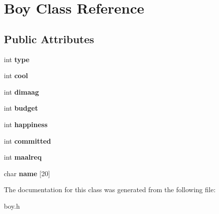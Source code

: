 \section{Boy Class Reference}
\label{class_boy}
\subsection*{Public Attributes}
\begin{DoxyCompactItemize}
\item 
\mbox{\label{class_boy_a1b907f52b73e8355ce0dd02db65afa4f}} 
int {\bfseries type}
\item 
\mbox{\label{class_boy_a44d742ad68096b9c0affdad1a4ddcd04}} 
int {\bfseries cool}
\item 
\mbox{\label{class_boy_a26953367863199783e35ccb0ceb10968}} 
int {\bfseries dimaag}
\item 
\mbox{\label{class_boy_a3b755250e77f892967872c7eb4c26685}} 
int {\bfseries budget}
\item 
\mbox{\label{class_boy_adaf15f15972678dbd77e8b8b319d5767}} 
int {\bfseries happiness}
\item 
\mbox{\label{class_boy_ab92b452f9cf9d97fc0c0f8aa6139da46}} 
int {\bfseries committed}
\item 
\mbox{\label{class_boy_a74a910a248f0c6bfc759a801e039c214}} 
int {\bfseries maalreq}
\item 
\mbox{\label{class_boy_af2786fbbf01d1f4b17f08eccce19a8fc}} 
char {\bfseries name} [20]
\end{DoxyCompactItemize}


The documentation for this class was generated from the following file\+:\begin{DoxyCompactItemize}
\item 
boy.\+h\end{DoxyCompactItemize}
